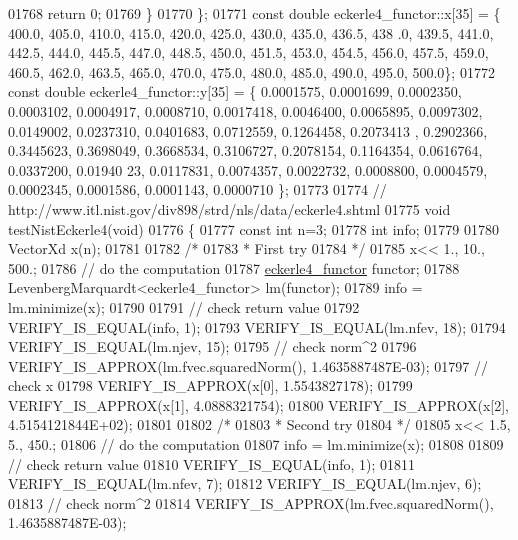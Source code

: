 \begin{DoxyCode}
01768         \textcolor{keywordflow}{return} 0;
01769     \}
01770 \};
01771 \textcolor{keyword}{const} \textcolor{keywordtype}{double} eckerle4\_functor::x[35] = \{ 400.0, 405.0, 410.0, 415.0, 420.0, 425.0, 430.0, 435.0, 436.5, 438
      .0, 439.5, 441.0, 442.5, 444.0, 445.5, 447.0, 448.5, 450.0, 451.5, 453.0, 454.5, 456.0, 457.5, 459.0, 460.5,
       462.0, 463.5, 465.0, 470.0, 475.0, 480.0, 485.0, 490.0, 495.0, 500.0\};
01772 \textcolor{keyword}{const} \textcolor{keywordtype}{double} eckerle4\_functor::y[35] = \{ 0.0001575, 0.0001699, 0.0002350, 0.0003102, 0.0004917, 0.0008710, 
      0.0017418, 0.0046400, 0.0065895, 0.0097302, 0.0149002, 0.0237310, 0.0401683, 0.0712559, 0.1264458, 0.2073413
      , 0.2902366, 0.3445623, 0.3698049, 0.3668534, 0.3106727, 0.2078154, 0.1164354, 0.0616764, 0.0337200, 0.01940
      23, 0.0117831, 0.0074357, 0.0022732, 0.0008800, 0.0004579, 0.0002345, 0.0001586, 0.0001143, 0.0000710 \};
01773 
01774 \textcolor{comment}{// http://www.itl.nist.gov/div898/strd/nls/data/eckerle4.shtml}
01775 \textcolor{keywordtype}{void} testNistEckerle4(\textcolor{keywordtype}{void})
01776 \{
01777   \textcolor{keyword}{const} \textcolor{keywordtype}{int} n=3;
01778   \textcolor{keywordtype}{int} info;
01779 
01780   VectorXd x(n);
01781 
01782   \textcolor{comment}{/*}
01783 \textcolor{comment}{   * First try}
01784 \textcolor{comment}{   */}
01785   x<< 1., 10., 500.;
01786   \textcolor{comment}{// do the computation}
01787   \hyperlink{structeckerle4__functor}{eckerle4\_functor} functor;
01788   LevenbergMarquardt<eckerle4\_functor> lm(functor);
01789   info = lm.minimize(x);
01790 
01791   \textcolor{comment}{// check return value}
01792   VERIFY\_IS\_EQUAL(info, 1);
01793   VERIFY\_IS\_EQUAL(lm.nfev, 18);
01794   VERIFY\_IS\_EQUAL(lm.njev, 15);
01795   \textcolor{comment}{// check norm^2}
01796   VERIFY\_IS\_APPROX(lm.fvec.squaredNorm(), 1.4635887487E-03);
01797   \textcolor{comment}{// check x}
01798   VERIFY\_IS\_APPROX(x[0], 1.5543827178);
01799   VERIFY\_IS\_APPROX(x[1], 4.0888321754);
01800   VERIFY\_IS\_APPROX(x[2], 4.5154121844E+02);
01801 
01802   \textcolor{comment}{/*}
01803 \textcolor{comment}{   * Second try}
01804 \textcolor{comment}{   */}
01805   x<< 1.5, 5., 450.;
01806   \textcolor{comment}{// do the computation}
01807   info = lm.minimize(x);
01808 
01809   \textcolor{comment}{// check return value}
01810   VERIFY\_IS\_EQUAL(info, 1);
01811   VERIFY\_IS\_EQUAL(lm.nfev, 7);
01812   VERIFY\_IS\_EQUAL(lm.njev, 6);
01813   \textcolor{comment}{// check norm^2}
01814   VERIFY\_IS\_APPROX(lm.fvec.squaredNorm(), 1.4635887487E-03);

\end{DoxyCode}
